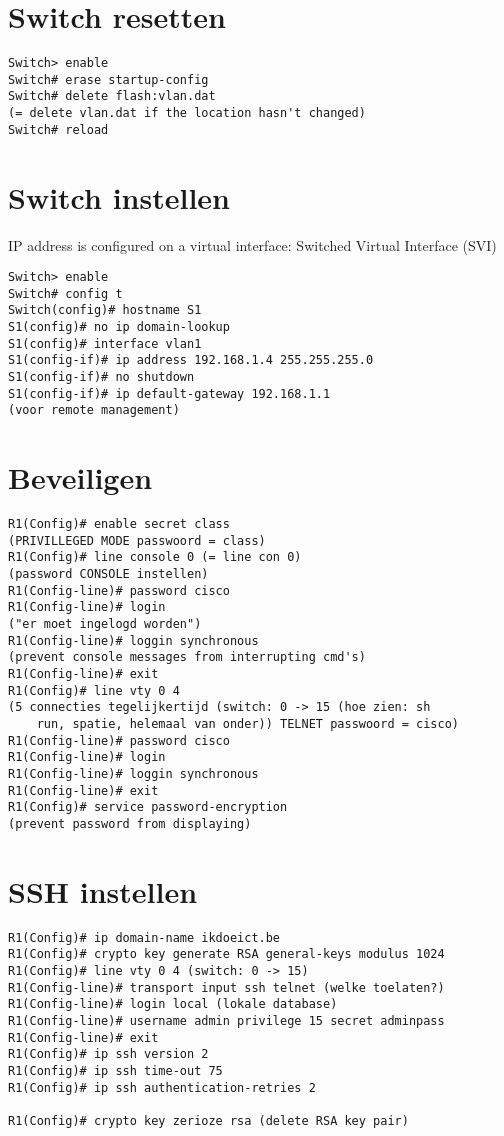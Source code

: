 \documentclass[10pt, a4paper]{article}
\begin{document}
\section{Switch resetten}
\begin{lstlisting}
Switch> enable
Switch# erase startup-config
Switch# delete flash:vlan.dat
(= delete vlan.dat if the location hasn't changed)
Switch# reload
\end{lstlisting}

\section{Switch instellen}
IP address is configured on a virtual interface: Switched Virtual Interface (SVI)\\
\begin{lstlisting}
Switch> enable
Switch# config t
Switch(config)# hostname S1
S1(config)# no ip domain-lookup
S1(config)# interface vlan1
S1(config-if)# ip address 192.168.1.4 255.255.255.0
S1(config-if)# no shutdown
S1(config-if)# ip default-gateway 192.168.1.1
(voor remote management)
\end{lstlisting}

\section{Beveiligen}
\begin{lstlisting}
R1(Config)# enable secret class
(PRIVILLEGED MODE passwoord = class)
R1(Config)# line console 0 (= line con 0)
(password CONSOLE instellen)
R1(Config-line)# password cisco
R1(Config-line)# login
("er moet ingelogd worden")
R1(Config-line)# loggin synchronous
(prevent console messages from interrupting cmd's)
R1(Config-line)# exit
R1(Config)# line vty 0 4
(5 connecties tegelijkertijd (switch: 0 -> 15 (hoe zien: sh
	run, spatie, helemaal van onder)) TELNET passwoord = cisco)
R1(Config-line)# password cisco
R1(Config-line)# login
R1(Config-line)# loggin synchronous
R1(Config-line)# exit
R1(Config)# service password-encryption
(prevent password from displaying)
\end{lstlisting}

\section{SSH instellen}
\begin{lstlisting}
R1(Config)# ip domain-name ikdoeict.be
R1(Config)# crypto key generate RSA general-keys modulus 1024
R1(Config)# line vty 0 4 (switch: 0 -> 15)
R1(Config-line)# transport input ssh telnet (welke toelaten?)
R1(Config-line)# login local (lokale database)
R1(Config-line)# username admin privilege 15 secret adminpass
R1(Config-line)# exit
R1(Config)# ip ssh version 2
R1(Config)# ip ssh time-out 75
R1(Config)# ip ssh authentication-retries 2

R1(Config)# crypto key zerioze rsa (delete RSA key pair)
\end{lstlisting}
\end{document}
